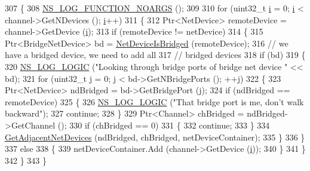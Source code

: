 \begin{DoxyCode}
307 \{
308   \hyperlink{log-macros-disabled_8h_a8f7e4afc291c9d29a65c18ac1f79197b}{NS\_LOG\_FUNCTION\_NOARGS} ();
309 
310   \textcolor{keywordflow}{for} (uint32\_t \hyperlink{bernuolliDistribution_8m_a6f6ccfcf58b31cb6412107d9d5281426}{i} = 0; \hyperlink{bernuolliDistribution_8m_a6f6ccfcf58b31cb6412107d9d5281426}{i} < channel->GetNDevices (); \hyperlink{bernuolliDistribution_8m_a6f6ccfcf58b31cb6412107d9d5281426}{i}++)
311     \{
312       Ptr<NetDevice> remoteDevice = channel->GetDevice (\hyperlink{bernuolliDistribution_8m_a6f6ccfcf58b31cb6412107d9d5281426}{i});
313       \textcolor{keywordflow}{if} (remoteDevice != netDevice)
314         \{
315           Ptr<BridgeNetDevice> bd = \hyperlink{classns3_1_1Ipv4NixVectorRouting_abf47d63e2dbb8022a042743feeb569c6}{NetDeviceIsBridged} (remoteDevice);
316           \textcolor{comment}{// we have a bridged device, we need to add all }
317           \textcolor{comment}{// bridged devices}
318           \textcolor{keywordflow}{if} (bd)
319             \{
320               \hyperlink{group__logging_ga88acd260151caf2db9c0fc84997f45ce}{NS\_LOG\_LOGIC} (\textcolor{stringliteral}{"Looking through bridge ports of bridge net device "} << bd);
321               \textcolor{keywordflow}{for} (uint32\_t j = 0; j < bd->GetNBridgePorts (); ++j)
322                 \{
323                   Ptr<NetDevice> ndBridged = bd->GetBridgePort (j);
324                   \textcolor{keywordflow}{if} (ndBridged == remoteDevice)
325                     \{
326                       \hyperlink{group__logging_ga88acd260151caf2db9c0fc84997f45ce}{NS\_LOG\_LOGIC} (\textcolor{stringliteral}{"That bridge port is me, don't walk backward"});
327                       \textcolor{keywordflow}{continue};
328                     \}
329                   Ptr<Channel> chBridged = ndBridged->GetChannel ();
330                   \textcolor{keywordflow}{if} (chBridged == 0)
331                     \{
332                       \textcolor{keywordflow}{continue};
333                     \}
334                   \hyperlink{classns3_1_1Ipv4NixVectorRouting_a1037f3752d6583eca8cd83c72e0673ea}{GetAdjacentNetDevices} (ndBridged, chBridged, netDeviceContainer);
335                 \}
336             \}
337           \textcolor{keywordflow}{else}
338             \{
339               netDeviceContainer.Add (channel->GetDevice (\hyperlink{bernuolliDistribution_8m_a6f6ccfcf58b31cb6412107d9d5281426}{i}));
340             \}
341         \}
342     \}
343 \}
\end{DoxyCode}


